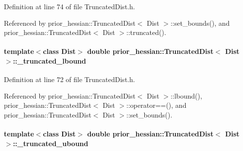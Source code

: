 Definition at line 74 of file Truncated\+Dist.\+h.



Referenced by prior\+\_\+hessian\+::\+Truncated\+Dist$<$ Dist $>$\+::set\+\_\+bounds(), and prior\+\_\+hessian\+::\+Truncated\+Dist$<$ Dist $>$\+::truncated().

\paragraph[{\texorpdfstring{\+\_\+truncated\+\_\+lbound}{_truncated_lbound}}]{\setlength{\rightskip}{0pt plus 5cm}template$<$class Dist$>$ double {\bf prior\+\_\+hessian\+::\+Truncated\+Dist}$<$ Dist $>$\+::\+\_\+truncated\+\_\+lbound\hspace{0.3cm}{\ttfamily [protected]}}\hypertarget{classprior__hessian_1_1TruncatedDist_accfebab73796b8a354b93bdcddfce0d8}{}\label{classprior__hessian_1_1TruncatedDist_accfebab73796b8a354b93bdcddfce0d8}


Definition at line 72 of file Truncated\+Dist.\+h.



Referenced by prior\+\_\+hessian\+::\+Truncated\+Dist$<$ Dist $>$\+::lbound(), prior\+\_\+hessian\+::\+Truncated\+Dist$<$ Dist $>$\+::operator==(), and prior\+\_\+hessian\+::\+Truncated\+Dist$<$ Dist $>$\+::set\+\_\+bounds().

\paragraph[{\texorpdfstring{\+\_\+truncated\+\_\+ubound}{_truncated_ubound}}]{\setlength{\rightskip}{0pt plus 5cm}template$<$class Dist$>$ double {\bf prior\+\_\+hessian\+::\+Truncated\+Dist}$<$ Dist $>$\+::\+\_\+truncated\+\_\+ubound\hspace{0.3cm}{\ttfamily [protected]}}\hypertarget{classprior__hessian_1_1TruncatedDist_a587fc5fedb96d7380e8085a70dd55560}{}\label{classprior__hessian_1_1TruncatedDist_a587fc5fedb96d7380e8085a70dd55560}


